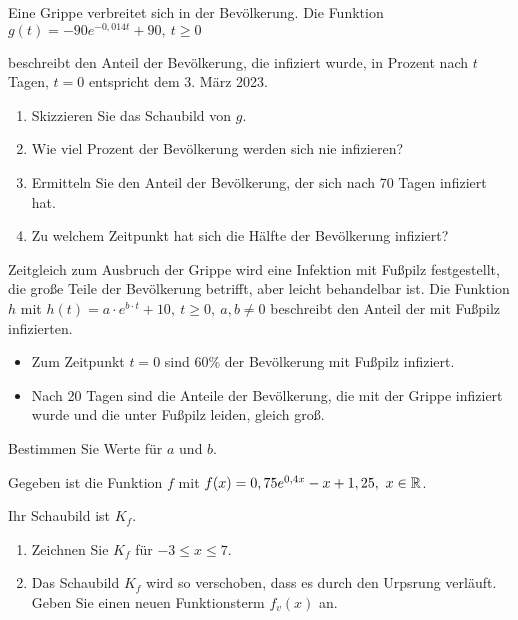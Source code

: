 \begin{Exercise}[title={Zeitansatz 26 min, mit Taschenrechner}, label=eFktVA_7]%

    Eine Grippe verbreitet sich in der Bevölkerung. Die Funktion \(g(t)=-90e^{-0,014t}+90,\ t\geq0\)

    beschreibt den Anteil der Bevölkerung, die infiziert wurde, in Prozent nach \(t\) Tagen, \(t=0\) entspricht dem 3. März 2023.
    \begin{enumerate}[label=\alph*)]
        \item Skizzieren Sie das Schaubild von \(g\).
        \item Wie viel Prozent der Bevölkerung werden sich nie infizieren?
        \item Ermitteln Sie den Anteil der Bevölkerung, der sich nach 70 Tagen infiziert hat.
        \item Zu welchem Zeitpunkt hat sich die Hälfte der Bevölkerung infiziert?
    \end{enumerate}
    Zeitgleich zum Ausbruch der Grippe wird eine Infektion mit Fußpilz festgestellt, die große Teile der Bevölkerung betrifft, aber leicht behandelbar ist. Die Funktion \(h\) mit \(h(t)=a\cdot e^{b\cdot t}+10,\ t\geq0,\ a,b\neq0\) beschreibt den Anteil der mit Fußpilz infizierten.
    \begin{itemize}
        \item Zum Zeitpunkt \(t=0\) sind 60\% der Bevölkerung mit Fußpilz infiziert.
        \item Nach 20 Tagen sind die Anteile der Bevölkerung, die mit der Grippe infiziert wurde und die unter Fußpilz leiden, gleich groß.
    \end{itemize}
    Bestimmen Sie Werte für \(a\) und \(b\).
\end{Exercise}
\begin{Exercise}[title={Zeitansatz 14 min, mit Taschenrechner}, label=eFktVA_8]%

    Gegeben ist die Funktion \(f\) mit \(f(x)=0,75e^{0,4x}-x+1,25,\ x\in\R\).

    Ihr Schaubild ist \(K_f\).
    \begin{enumerate}[label=\alph*)]
        \item Zeichnen Sie \(K_f\) für \(-3\leq x\leq 7\).
        \item Das Schaubild \(K_f\) wird so verschoben, dass es durch den Urpsrung verläuft. Geben Sie einen neuen Funktionsterm \(f_v(x)\) an.
    \end{enumerate}
\end{Exercise}
